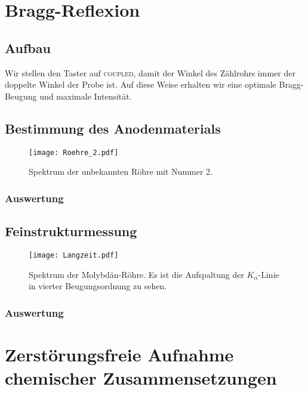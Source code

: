 \chapter{Bragg-Reflexion}

\section{Aufbau}

\parencite{wikipedia/Goniometer}
\parencite{wikipedia/hygroskopie}
\parencite{leybold/554831}
\parencite{leybold/554800}

Wir stellen den Taster auf \textsc{coupled}, damit der Winkel des Zählrohrs immer
der doppelte Winkel der Probe ist. \parencite{leybold/554800} Auf diese Weise
erhalten wir eine optimale Bragg-Beugung und maximale Intensität.

\section{Bestimmung des Anodenmaterials}

\begin{figure}[htbp]
    \centering
    \texttt{[image: Roehre\_2.pdf]}
    \caption{%
        Spektrum der unbekannten Röhre mit Nummer 2.
    }
    \label{fig:}
\end{figure}

\subsection{Auswertung}

\section{Feinstrukturmessung}

\begin{figure}[htbp]
    \centering
    \texttt{[image: Langzeit.pdf]}
    \caption{%
        Spektrum der Molybdän-Röhre. Es ist die Aufspaltung der
        $K_\alpha$-Linie in vierter Beugungsordnung zu sehen.
    }
    \label{fig:}
\end{figure}

\subsection{Auswertung}

\chapter{Zerstörungsfreie Aufnahme chemischer Zusammensetzungen}

